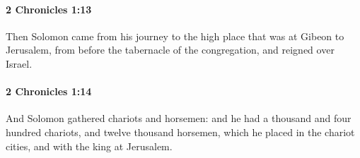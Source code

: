 		\paragraph{2 Chronicles 1:13} %
			\label{2CHRONICLES-1-13}

			Then Solomon came from his journey to the high place that was at Gibeon to Jerusalem, from before the tabernacle of the congregation, and reigned over Israel.


		\paragraph{2 Chronicles 1:14} %
			\label{2CHRONICLES-1-14}

			And Solomon gathered chariots and horsemen: and he had a thousand and four hundred chariots, and twelve thousand horsemen, which he placed in the chariot cities, and with the king at Jerusalem.


